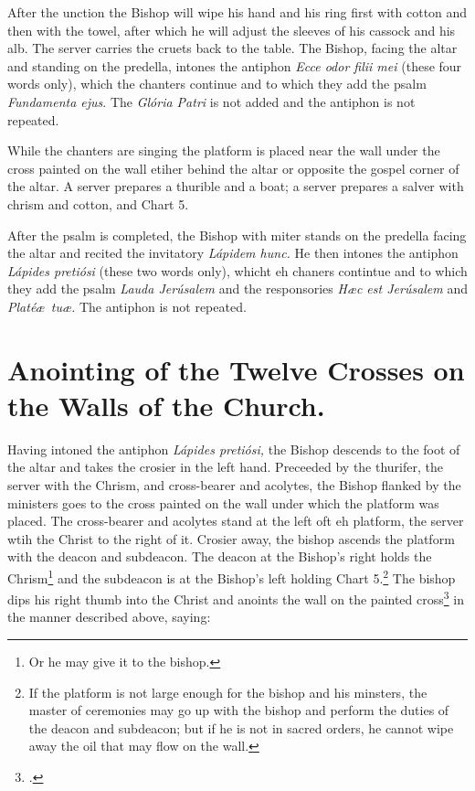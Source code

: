 \documentclass[letterpaper]{report}
\begin{document}
{\rubric After the unction the Bishop will wipe his hand and his ring first with
cotton and then with the towel, after which he will adjust the sleeves of his
cassock and his alb. The server carries the cruets back to the table. The
Bishop, facing the altar and standing on the predella, intones the antiphon
\textit{Ecce odor filii mei} (these four words only), which the chanters
continue and to which they add the psalm \textit{Fundamenta ejus}. The
\textit{Glória Patri} is not added and the antiphon is not repeated.

While the chanters are singing the platform is placed near the wall under the
cross painted on the wall etiher behind the altar or opposite the gospel corner
of the altar. A server prepares a thurible and a boat; a server prepares a
salver with chrism and cotton, and Chart 5.

\rubric After the psalm is completed, the Bishop with miter stands on the
predella facing the altar and recited the invitatory \textit{Lápidem hunc.} He
then intones the antiphon \textit{Lápides pretiósi} (these two words only),
whicht eh chaners contintue and to which they add the psalm \textit{Lauda
Jerúsalem} and the responsories \textit{H\ae c est Jerúsalem} and
\textit{Platé\ae\ tu\ae.} The antiphon is not repeated.

\section{Anointing of the Twelve Crosses on the Walls of the Church.}

\rubric Having intoned the antiphon \textit{Lápides pretiósi,} the Bishop
descends to the foot of the altar and takes the crosier in the left hand.
Preceeded by the thurifer, the server with the Chrism, and cross-bearer and
acolytes, the Bishop flanked by the ministers goes to the cross painted on the
wall under which the platform was placed. The cross-bearer and acolytes stand
at the left oft eh platform, the server wtih the Christ to the right of it.
Crosier away, the bishop ascends the platform with the deacon and subdeacon.
The deacon at the Bishop's right holds the Chrism\footnote{Or he may give it to
the bishop.} and the subdeacon is at the Bishop's left holding Chart
5.\footnote{If the platform is not large enough for the bishop and his
minsters, the master of ceremonies may go up with the bishop and perform the
duties of the deacon and subdeacon; but if he is not in sacred orders, he
cannot wipe away the oil that may flow on the wall.} The bishop dips his right
thumb into the Christ and anoints the wall on the painted
cross\footcite[\textit{Above} or \textit{below} the cross, if it be of marble
or metal. See][note 2, p. 112.]{stehle} in the manner described above, saying:

}
\end{document}
